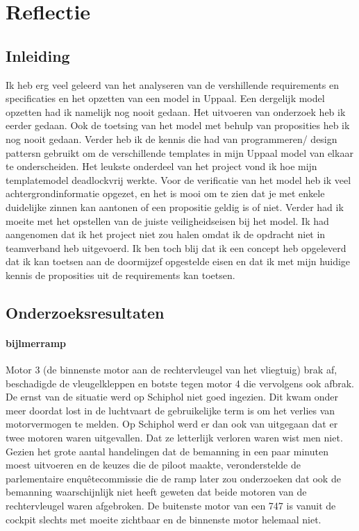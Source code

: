 \chapter{Reflectie}

\section{Inleiding}

Ik heb erg veel geleerd van het analyseren van de vershillende requirements en specificaties en het opzetten van een model in Uppaal. Een dergelijk model opzetten had ik namelijk nog nooit gedaan. Het uitvoeren van onderzoek heb ik eerder gedaan. Ook de toetsing van het model met behulp van proposities heb ik nog nooit gedaan. Verder heb ik de kennis die had van programmeren/ design pattersn gebruikt om de verschillende templates in mijn Uppaal model van elkaar te onderscheiden. Het leukste onderdeel van het project vond ik hoe mijn templatemodel deadlockvrij werkte. Voor de verificatie van het model heb ik veel achtergrondinformatie opgezet, en het is mooi om te zien dat je met enkele duidelijke zinnen kan aantonen of een propositie geldig is of niet.  Verder had ik moeite met het opstellen van de juiste veiligheidseisen bij het model. Ik had aangenomen dat ik het project niet zou halen omdat ik de opdracht niet in teamverband heb uitgevoerd. Ik ben toch blij dat ik een concept heb opgeleverd dat ik kan toetsen aan de doormijzef opgestelde eisen en dat ik met mijn huidige kennis de proposities uit de requirements kan toetsen.


\section{Onderzoeksresultaten}




\subsubsection{bijlmerramp}
Motor 3 (de binnenste motor aan de rechtervleugel van het vliegtuig) brak af, beschadigde de vleugelkleppen en botste tegen motor 4 die vervolgens ook afbrak.
De ernst van de situatie werd op Schiphol niet goed ingezien. Dit kwam onder meer doordat lost in de luchtvaart de gebruikelijke term is om het verlies van motorvermogen te melden. Op Schiphol werd er dan ook van uitgegaan dat er twee motoren waren uitgevallen. Dat ze letterlijk verloren waren wist men niet. Gezien het grote aantal handelingen dat de bemanning in een paar minuten moest uitvoeren en de keuzes die de piloot maakte, veronderstelde de parlementaire enquêtecommissie die de ramp later zou onderzoeken dat ook de bemanning waarschijnlijk niet heeft geweten dat beide motoren van de rechtervleugel waren afgebroken. De buitenste motor van een 747 is vanuit de cockpit slechts met moeite zichtbaar en de binnenste motor helemaal niet.

